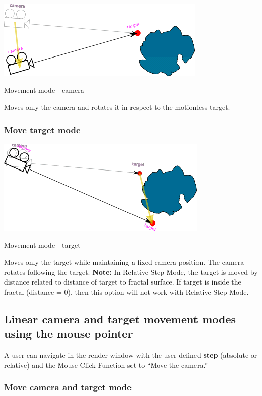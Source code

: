 \includegraphics[width=3.95347in,height=1.48819in]{img/manual/media/image12.png}

Movement mode - camera

Moves only the camera and rotates it in respect to the motionless target.

\subsubsection{Move target mode}\label{move-target-mode}

\includegraphics[width=3.98819in,height=1.80208in]{img/manual/media/image13.png}

Movement mode - target

Moves only the target while maintaining a fixed camera position. The camera
rotates following the target. \textbf{Note:} In Relative Step Mode, the target
is moved by distance related to distance of target to fractal surface. If target
is inside the fractal (distance = 0), then this option will not work with
Relative Step Mode.

\subsection{Linear camera and target movement modes using the mouse
	pointer}\label{linear-camera-and-target-movement-modes-using-the-mouse-pointer}

A user can navigate in the render window with the user-defined \textbf{step}
(absolute or relative) and the Mouse Click Function set to ``Move the camera.''

\subsubsection{Move camera and target mode}\label{move-camera-and-target-mode-1}

